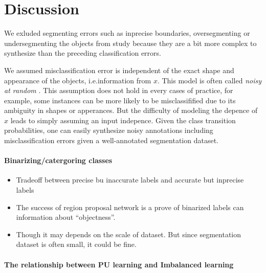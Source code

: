 \section{Discussion}
\label{sec:discussion}


We exluded segmenting errors such as inprecise boundaries, oversegmenting or undersegmenting the objects from study because they are a bit more complex to synthesize than the preceding classification errors.

We assumed misclassification error is independent of the exact shape and appearance of the objects, i.e.information from $x$.
This model is often called \textit{noisy at random} \cite{frenay2014classification}.
This assumption does not hold in every cases of practice, for example, some instances can be more likely to be misclassifified due to its ambiguity in shapes or apperances.
But the difficulty of modeling the depence of $x$ leads to simply assuming an input indepence.
Given the class transition probabilities, one can easily synthesize noisy annotations including misclassification errors given a well-annotated segmentation dataset.

\paragraph{Binarizing/catergoring classes}
\begin{itemize}
  \item Tradeoff between precise bu inaccurate labels and accurate but inprecise labels
  \item The success of region proposal network is a prove of binarized labels can information about ``objectness''.
  \item Though it may depends on the scale of dataset. But since segmentation dataset is often small, it could be fine.
\end{itemize}

\paragraph{The relationship between PU learning and Imbalanced learning}

